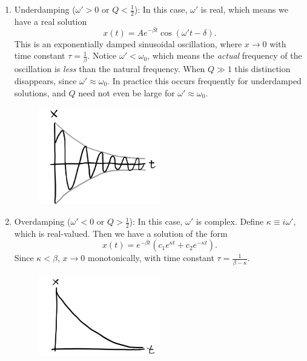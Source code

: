 \documentclass[
  letterpaper,
  DIV=11,
  numbers=noendperiod]{scrreprt}
\begin{document}
\begin{enumerate}
\def\labelenumi{\arabic{enumi}.}
\item
  Underdamping (\(\omega' > 0\) or \(Q < \frac{1}{2}\)): In this case,
  \(\omega'\) is real, which means we have a real solution \[
  x(t) = A e^{-\beta t} \cos(\omega't - \delta).
  \] This is an exponentially damped sinusoidal oscillation, where
  \(x \rightarrow 0\) with time constant \(\tau = \frac{1}{\beta}\).
  Notice \(\omega' < \omega_0\), which means the \emph{actual} frequency
  of the oscillation is \emph{less} than the natural frequency. When
  \(Q \gg 1\) this distinction disappears, since
  \(\omega' \approx \omega_0\). In practice this occurs frequently for
  underdamped solutions, and \(Q\) need not even be large for
  \(\omega' \approx \omega_0\).

  \begin{figure}

  {\centering \includegraphics[width=2.08333in,height=\textheight]{classical-mechanics/./resources/image-20230215123127416.png}

  }

  \end{figure}
\item
  Overdamping (\(\omega' < 0\) or \(Q > \frac{1}{2}\)): In this case,
  \(\omega'\) is complex. Define \(\kappa \equiv i\omega'\), which is
  real-valued. Then we have a solution of the form \[
  x(t) = e^{-\beta t}(c_1 e^{\kappa t} + c_2 e^{-\kappa t}).
  \] Since \(\kappa < \beta\), \(x \rightarrow 0\) monotonically, with
  time constant \(\tau = \frac{1}{\beta - \kappa}\).

  \begin{figure}

  {\centering \includegraphics[width=2.08333in,height=\textheight]{classical-mechanics/./resources/image-20230215123205612.png}

}
\end{figure}
\end{enumerate}
\end{document}
